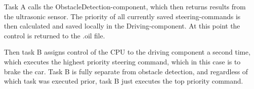 Task A calls the ObstacleDetection-component, which then returns results from the ultrasonic sensor. The priority of all currently saved steering-commands is then calculated and saved locally in the Driving-component. At this point the control is returned to the .oil file. 

Then task B assigns control of the CPU to the driving component a second time, which executes the highest priority steering command, which in this case is to brake the car. Task B is fully separate from obstacle detection, and regardless of which task was executed prior, task B just executes the top priority command. 








